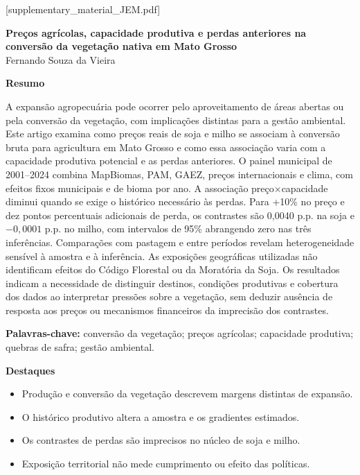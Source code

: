 
[supplementary_material_JEM.pdf]

\pagestyle{plain}
\begin{center}
{\Large\bfseries Preços agrícolas, capacidade produtiva e perdas anteriores na conversão da vegetação nativa em Mato Grosso}\\[0.5cm]
Fernando Souza da Vieira
\end{center}

\noindent\textbf{Resumo}

A expansão agropecuária pode ocorrer pelo aproveitamento de áreas abertas ou pela conversão da vegetação, com implicações distintas para a gestão ambiental. Este artigo examina como preços reais de soja e milho se associam à conversão bruta para agricultura em Mato Grosso e como essa associação varia com a capacidade produtiva potencial e as perdas anteriores. O painel municipal de 2001--2024 combina MapBiomas, PAM, GAEZ, preços internacionais e clima, com efeitos fixos municipais e de bioma por ano. A associação preço×capacidade diminui quando se exige o histórico necessário às perdas. Para +10\% no preço e dez pontos percentuais adicionais de perda, os contrastes são 0,0040 p.p. na soja e $-0,0001$ p.p. no milho, com intervalos de 95\% abrangendo zero nas três inferências. Comparações com pastagem e entre períodos revelam heterogeneidade sensível à amostra e à inferência. As exposições geográficas utilizadas não identificam efeitos do Código Florestal ou da Moratória da Soja. Os resultados indicam a necessidade de distinguir destinos, condições produtivas e cobertura dos dados ao interpretar pressões sobre a vegetação, sem deduzir ausência de resposta aos preços ou mecanismos financeiros da imprecisão dos contrastes.

\medskip
\noindent\textbf{Palavras-chave:} conversão da vegetação; preços agrícolas; capacidade produtiva; quebras de safra; gestão ambiental.

\medskip
\noindent\textbf{Destaques}
\begin{itemize}
\item Produção e conversão da vegetação descrevem margens distintas de expansão.
\item O histórico produtivo altera a amostra e os gradientes estimados.
\item Os contrastes de perdas são imprecisos no núcleo de soja e milho.
\item Exposição territorial não mede cumprimento ou efeito das políticas.
\end{itemize}

